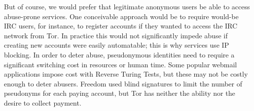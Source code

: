 \documentclass{llncs}
\newenvironment{tightlist}{\begin{list}{$\bullet$}{
  \setlength{\itemsep}{0mm}
    \setlength{\parsep}{0mm}
    }}{\end{list}}
\begin{document}
But of course, we would prefer that legitimate anonymous users be able to
access abuse-prone services.  One conceivable approach would be to require
would-be IRC users, for instance, to register accounts if they wanted to
access the IRC network from Tor.  In practice this would not
significantly impede abuse if creating new accounts were easily automatable;
this is why services use IP blocking.  In order to deter abuse, pseudonymous
identities need to require a significant switching cost in resources or human
time.  Some popular webmail applications
impose cost with Reverse Turing Tests, but these may not be costly enough to
deter abusers.  Freedom used blind signatures to limit
the number of pseudonyms for each paying account, but Tor has neither the
ability nor the desire to collect payment.


\end{document}
